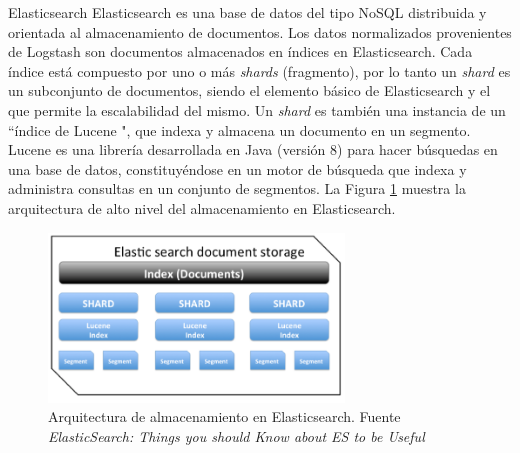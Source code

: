    \begin{subsection}{Elasticsearch}
        Elasticsearch es una base de datos del tipo NoSQL distribuida y orientada al almacenamiento de documentos. Los datos normalizados provenientes de Logstash son documentos almacenados en índices en Elasticsearch. Cada índice está compuesto por uno o más \textit{shards} (fragmento), por lo tanto un \textit{shard} es un subconjunto de documentos, siendo el elemento básico de Elasticsearch y el que permite la escalabilidad del mismo. Un \textit{shard} es también una instancia de un “índice de Lucene \cite{lucene}", que indexa y almacena un documento en un segmento. Lucene es una librería desarrollada en Java (versión 8) para hacer búsquedas en una base de datos, constituyéndose en un motor de búsqueda que indexa y administra consultas en un conjunto de segmentos. La Figura \ref{fig:figura_21_arq_alm_elasticsearch} muestra la arquitectura de alto nivel del almacenamiento en Elasticsearch.
        
        \begin{figure}[H]
            \centering
            \includegraphics[width=0.7\textwidth]{./descripcion_sonion_imagenes/figura_21_arq_alm_elasticsearch.png}
            \caption{Arquitectura de almacenamiento en Elasticsearch. Fuente \textit{ElasticSearch: Things you should Know about ES to be Useful} \cite{es_storage}}
            \label{fig:figura_21_arq_alm_elasticsearch}
        \end{figure}
    \end{subsection}
